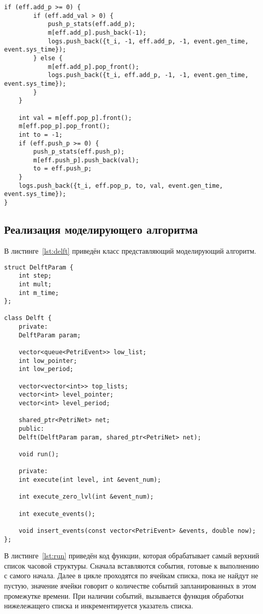 \begin{center}
\begin{lstlisting}[label=lst:fire,caption=Функции срабатывания перехода ,showstringspaces=false]
	if (eff.add_p >= 0) {
		if (eff.add_val > 0) {
			push_p_stats(eff.add_p);
			m[eff.add_p].push_back(-1);
			logs.push_back({t_i, -1, eff.add_p, -1, event.gen_time, event.sys_time});
		} else {
			m[eff.add_p].pop_front();
			logs.push_back({t_i, eff.add_p, -1, -1, event.gen_time, event.sys_time});
		}
	}
	
	int val = m[eff.pop_p].front();
	m[eff.pop_p].pop_front();
	int to = -1;
	if (eff.push_p >= 0) {
		push_p_stats(eff.push_p);
		m[eff.push_p].push_back(val);
		to = eff.push_p;
	}
	logs.push_back({t_i, eff.pop_p, to, val, event.gen_time, event.sys_time});
}

	\end{lstlisting}
\end{center}
\FloatBarrier

\subsection{Реализация моделирующего алгоритма}

В листинге~\ref{lst:delft} приведён класс представляющий моделирующий алгоритм.

\begin{center}
	\captionsetup{justification=raggedright,singlelinecheck=off}
	\begin{lstlisting}[label=lst:delft,caption=Класс моделирующего алгоритма ,showstringspaces=false]
struct DelftParam {
	int step;
	int mult;
	int m_time;
};

class Delft {
	private:
	DelftParam param;
	
	vector<queue<PetriEvent>> low_list;
	int low_pointer;
	int low_period;
	
	vector<vector<int>> top_lists;
	vector<int> level_pointer;
	vector<int> level_period;
	
	shared_ptr<PetriNet> net;
	public:
	Delft(DelftParam param, shared_ptr<PetriNet> net);
	
	void run();
	
	private:
	int execute(int level, int &event_num);
	
	int execute_zero_lvl(int &event_num);
	
	int execute_events();
	
	void insert_events(const vector<PetriEvent> &events, double now);
};		
	\end{lstlisting}
\end{center}
\FloatBarrier

В листинге~\ref{lst:run} приведён код функции, которая обрабатывает самый верхний список часовой структуры. Сначала вставляются события, готовые к выполнению с самого начала. Далее в цикле проходятся по ячейкам списка, пока не найдут не пустую, значение ячейки говорит о количестве событий запланированных в этом промежутке времени. При наличии событий, вызывается функция обработки нижележащего списка и инкрементируется указатель списка.

